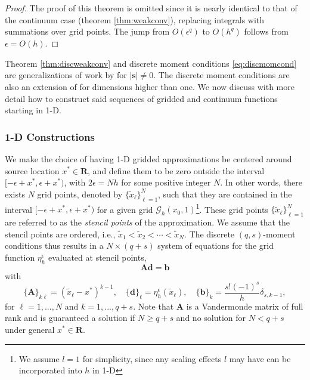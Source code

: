 \begin{proof}
The proof of this theorem is omitted since it is nearly identical to that of the continuum case (theorem \ref{thm:weakconv}), replacing integrals with summations over grid points.
The jump from $O(\epsilon^q)$ to $O(h^q)$ follows from $\epsilon=O(h)$.
\end{proof}

Theorem \ref{thm:discweakconv} and discrete moment conditions \ref{eq:discmomcond} are generalizations of work by \cite{TorEng:04} for $|\mathbf s|\neq 0$. 
The discrete moment conditions are also an extension of \cite{Walden:1999} for dimensions higher than one.
We now discuss with more detail how to construct said sequences of gridded and continuum functions starting in 1-D.

\subsubsection{1-D Constructions}

We make the choice of having 1-D gridded approximations be centered around source location $x^*\in\mathbf R$, and define them to be zero outside the interval $[-\epsilon+x^*,\epsilon+x^*)$, with $2\epsilon=Nh$ for some positive integer $N$.
In other words, there exists $N$ grid points, denoted by $\{\tilde x_\ell\}_{\ell=1}^{N}$, such that they are contained in the interval $[-\epsilon+x^*,\epsilon+x^*)$ for a given grid $\mathcal G_h(x_0,1)$\footnote{We assume $l=1$ for simplicity, since any scaling effects $l$ may have can be incorporated into $h$ in 1-D}.
These grid points $\{\tilde x_\ell\}_{\ell=1}^N$ are referred to as the \emph{stencil points} of the approximation.
We assume that the stencil points are ordered, i.e., $\tilde x_1<\tilde x_2<\cdots<\tilde x_{N}$.
The discrete $(q,s)$-moment conditions thus results in a $N\times(q+s)$ system of equations for the grid function $\eta_h^\epsilon$ evaluated at stencil points,
\[
	\mathbf A \mathbf d = \mathbf b
\]
with 
\[
	\{\mathbf A\}_{k\ell} = (\tilde x_\ell-x^*)^{k-1}, \quad \{\mathbf d\}_{\ell}=\eta_h^\epsilon(\tilde x_\ell), \quad \{\mathbf b\}_{k}= \frac{s! (-1)^s}{h} \delta_{s,k-1},
\]
for $\ell=1,...,N$ and $k=1,...,q+s$.
Note that $\mathbf A$ is a Vandermonde matrix of full rank and is guaranteed a solution if $N\ge q+s$ and no solution for $N<q+s$ under general $x^*\in\mathbf R$.

